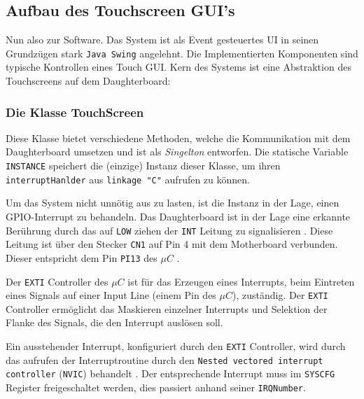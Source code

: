 \subsection{Aufbau des Touchscreen GUI's}
	Nun also zur Software. 
	Das System ist als Event gesteuertes UI in seinen Grundzügen stark \texttt{Java Swing} angelehnt.
	Die Implementierten Komponenten sind typische Kontrollen eines Touch GUI.
	Kern des Systems ist eine Abstraktion des Touchscreens auf dem Daughterboard:
	
	\subsubsection{Die Klasse TouchScreen}\label{sec:touchscreen_class}
		\begin{figure}
			\scalebox{0.75}{
				\begin{tikzpicture}
					
				\end{tikzpicture}
			}
		\end{figure}
		Diese Klasse bietet verschiedene Methoden, welche die Kommunikation mit dem Daughterboard umsetzen und ist als \emph{Singelton} entworfen.
		Die statische Variable \texttt{INSTANCE} speichert die (einzige) Instanz dieser Klasse, um ihren \texttt{interruptHanlder} aus \texttt{linkage "C"} aufrufen zu können.
		
		Um das System nicht unnötig aus zu lasten, ist die Instanz in der Lage, einen GPIO-Interrupt zu behandeln.
		Das Daughterboard ist in der Lage eine erkannte Berührung durch das auf \texttt{LOW} ziehen der \texttt{INT} Leitung zu signalisieren \cite[8\psq]{ts-userManual}.
		Diese Leitung ist über den Stecker \texttt{CN1} auf Pin 4 mit dem Motherboard verbunden. Dieser entspricht dem Pin \texttt{PI13} des $\mu C$ \cite[27\psq]{disco-userManual}.
		
		Der \texttt{EXTI} Controller des $\mu C$ ist für das Erzeugen eines Interrupts, beim Eintreten eines Signals auf einer Input Line (einem Pin des $\mu C$), zuständig.
		Der \texttt{EXTI} Controller ermöglicht das Maskieren einzelner Interrupts und Selektion der Flanke des Signals, die den Interrupt auslösen soll. \cite[319\psqq]{stm32_refManual}
		
		Ein ausstehender Interrupt, konfiguriert durch den \texttt{EXTI} Controller, wird durch das aufrufen der Interruptroutine durch den \texttt{Nested vectored interrupt controller} (\texttt{NVIC}) behandelt \cite[313\psqq]{stm32_refManual}.
		Der entsprechende Interrupt muss im \texttt{SYSCFG} Register freigeschaltet werden, dies passiert anhand seiner \texttt{IRQNumber}.
		
